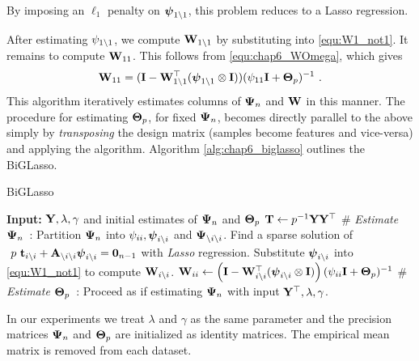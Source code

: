     By imposing an $\ell_1$ penalty on $\boldsymbol{\psi}_{1\setminus1}$, this problem reduces to a Lasso regression.
    
    After estimating $\psi_{1\setminus1}$, we compute $\mathbf{W}_{1\setminus1}$ by substituting into \eqref{equ:W1_not1}.
    It remains to compute $\mathbf{W}_{11}$. This follows from \eqref{equ:chap6_WOmega}, which gives
    \[
      \mathbf{W}_{11} = (\mathbf{I} - \mathbf{W}_{1\setminus1}^\top (\boldsymbol{\psi}_{1\setminus1} \otimes \mathbf{I})) (\psi_{11}\mathbf{I} + \mathbf{\Theta}_p)^{-1} ~.
    \]
    This algorithm iteratively estimates columns of $\mathbf{\Psi}_n$ and $\mathbf{W}$ in this manner.
    The procedure for estimating $\mathbf{\Theta}_p$, for fixed $\mathbf{\Psi}_n$, becomes directly parallel to the above simply by \emph{transposing} the design matrix (samples become features and vice-versa) and applying the algorithm.
    Algorithm \ref{alg:chap6_biglasso} outlines the BiGLasso.
    
    \begin{algorithm}[!htbp] 
      \caption{BiGLasso} 
      \begin{algorithmic} \label{alg:chap6_biglasso}
        \STATE \textbf{Input:} $\mathbf{Y}, \lambda, \gamma$ and initial estimates of $\mathbf{\Psi}_n$ and $\mathbf{\Theta}_p$
        \STATE $\mathbf{T} \leftarrow p^{-1}\mathbf{Y}\mathbf{Y}^\top$
        \REPEAT
          \STATE \# \emph{Estimate $\mathbf{\Psi}_n$}~:
            \STATE Partition $\mathbf{\Psi}_n$ into $\psi_{ii}, \boldsymbol{\psi}_{i \setminus i}$ and $\mathbf{\Psi}_{\setminus i \setminus i}$.
            \STATE Find a sparse solution of $~ p ~ \mathbf{t}_{i \setminus i} + \mathbf{A}_{\setminus i \setminus i} \boldsymbol{\psi}_{i \setminus i} = \mathbf{0}_{n-1}$ with \emph{Lasso} regression.
            \STATE Substitute $\boldsymbol{\psi}_{i \setminus i}$ into \eqref{equ:W1_not1} to compute $\mathbf{W}_{i \setminus i}$.
            \STATE $\mathbf{W}_{ii} \leftarrow \left( \mathbf{I} - \mathbf{W}_{i \setminus i}^\top (\boldsymbol{\psi}_{i \setminus i} \otimes \mathbf{I}) \right) (\psi_{ii}\mathbf{I} + \mathbf{\Theta}_p)^{-1}$
          \ENDFOR
          \STATE \# \emph{Estimate $\mathbf{\Theta}_p$}~:
          \STATE Proceed as if estimating $\mathbf{\Psi}_n$ with input $\mathbf{Y}^\top, \lambda, \gamma$.
      \end{algorithmic}
    \end{algorithm}
    In our experiments we treat $\lambda$ and $\gamma$ as the same parameter and the precision matrices $\mathbf{\Psi}_n$ and $\mathbf{\Theta}_p$ are initialized as identity matrices. The empirical mean matrix is removed from each dataset.
        

